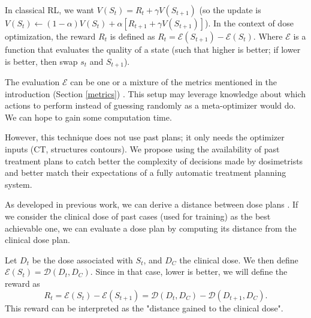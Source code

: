 In classical RL, we want $V(S_t) = R_t + \gamma V(S_{t+1})$
(so the update is $V(S_t) \leftarrow (1-\alpha) V(S_t) + \alpha \left[ R_{t+1} + \gamma V(S_{t+1}) \right]$).
In the context of dose optimization, the reward $R_t$ is defined as $R_t = \mathcal{E}(S_{t+1}) - \mathcal{E}(S_t)$.
Where $\mathcal{E}$ is a function that evaluates the quality of a state (such that higher is better; if lower is better, then swap $s_t$ and $S_{t+1}$).

The evaluation $\mathcal{E}$ can be one or a mixture of the metrics mentioned in the introduction (Section \ref{metrics}) \cite{shen_hierarchical_2021} \cite{shen_intelligent_2019} \cite{moreau_reinforcement_2021}.
This setup may leverage knowledge about which actions to perform instead of guessing randomly as a meta-optimizer would do.
We can hope to gain some computation time.

However, this technique does not use past plans; it only needs the optimizer inputs (CT, structures contours).
We propose using the availability of past treatment plans to catch better the complexity of decisions made by dosimetrists and better match their expectations of a fully automatic treatment planning system.

As developed in previous work, we can derive a distance between dose plans \cite{paul_dubois_novel_2024}.
If we consider the clinical dose of past cases (used for training) as the best achievable one, we can evaluate a dose plan by computing its distance from the clinical dose plan.

Let $D_t$ be the dose associated with $S_t$, and $D_C$ the clinical dose.
We then define $\mathcal{E}(S_t) = \mathcal{D}(D_t, D_C)$.
Since in that case, lower is better, we will define the reward as $$R_t = \mathcal{E}(S_t) - \mathcal{E}(S_{t+1}) = \mathcal{D}(D_t, D_C) - \mathcal{D}(D_{t+1}, D_C).$$
This reward can be interpreted as the "distance gained to the clinical dose".


